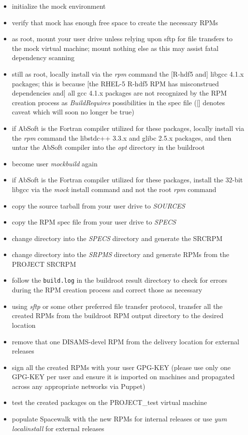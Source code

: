\documentclass[12pt,letterpaper]{article}
\begin{document}
\begin{itemize}
\item initialize the mock environment
\item verify that mock has enough free space to create the necessary RPMs
\item as root, mount your user drive unless relying upon sftp for file transfers to the mock virtual machine; mount nothing else as this may assist fatal dependency scanning
\item still as root, locally install via the \emph{rpm} command the [R-hdf5 and] libgcc 4.1.x packages; this is because [the RHEL-5 R-hdf5 RPM has misconstrued dependencies and] all gcc 4.1.x packages are not recognized by the RPM creation process as \emph{BuildRequires} possibilities in the spec file ([] denotes caveat which will soon no longer be true)
\item if AbSoft is the Fortran compiler utilized for these packages, locally install via the \emph{rpm} command the libstdc++ 3.3.x and glibc 2.5.x packages, and then untar the AbSoft compiler into the \emph{opt} directory in the buildroot
\item become user \emph{mockbuild} again
\item if AbSoft is the Fortran compiler utilized for these packages, install the 32-bit libgcc via the \emph{mock} install command and not the root \emph{rpm} command
\item copy the source tarball from your user drive to \emph{SOURCES}
\item copy the RPM spec file from your user drive to \emph{SPECS}
\item change directory into the \emph{SPECS} directory and generate the SRCRPM
\item change directory into the \emph{SRPMS} directory and generate RPMs from the PROJECT SRCRPM
\item follow the \verb|build.log| in the buildroot result directory to check for errors during the RPM creation process and correct those as necessary
\item using \emph{sftp} or some other preferred file transfer protocol, transfer all the created RPMs from the buildroot RPM output directory to the desired location
\item remove that one DISAMS-devel RPM from the delivery location for external releases
\item sign all the created RPMs with your user GPG-KEY (please use only one GPG-KEY per user and ensure it is imported on machines and propagated across any appropriate networks via Puppet)
\item test the created packages on the PROJECT\_test virtual machine
\item populate Spacewalk with the new RPMs for internal releases or use \emph{yum localinstall} for external releases
\end{itemize}
\end{document}
